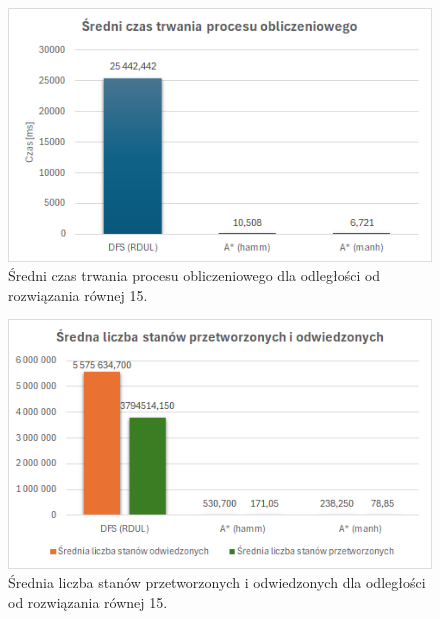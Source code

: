 \documentclass{classrep}
\begin{document}
{    \begin{figure}[!h]
        \centering
        \includegraphics[width=\textwidth,height=\textheight,keepaspectratio]{average-time-for-big-grapth}
        \caption{Średni czas trwania procesu obliczeniowego dla odległości od rozwiązania równej 15.}
        \label{fig:6}
    \end{figure}
    \begin{figure}[!h]
        \centering
        \includegraphics[width=\textwidth,height=\textheight,keepaspectratio]{average-count-of-visited-for-big-graph}
        \caption{Średnia liczba stanów przetworzonych i odwiedzonych dla odległości od rozwiązania równej 15.}
        \label{fig:7}
    \end{figure}
  }\label{sec:wyniki}
\end{document}
